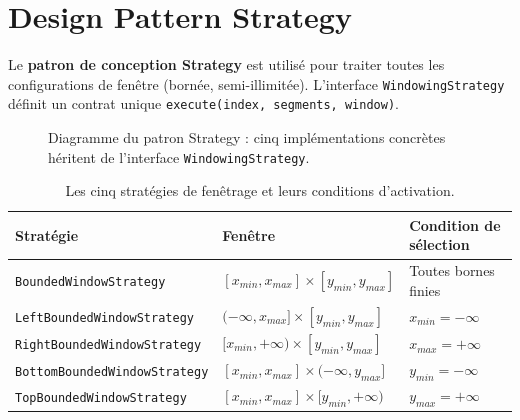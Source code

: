 \documentclass[11pt,a4paper]{article}
\begin{document}
\section{Design Pattern Strategy}

Le \textbf{patron de conception Strategy} est utilisé pour traiter toutes les configurations de fenêtre (bornée, semi-illimitée). L'interface \texttt{WindowingStrategy} définit un contrat unique \texttt{execute(index, segments, window)}.

\begin{figure}[h]
\centering
{}
\caption{Diagramme du patron Strategy : cinq implémentations concrètes héritent de l'interface \texttt{WindowingStrategy}.}
\label{fig:strategy}
\end{figure}

\begin{table}[h]
\centering
\begin{tabular}{@{}lll@{}}
\toprule
\textbf{Stratégie} & \textbf{Fenêtre} & \textbf{Condition de sélection} \\
\midrule
\texttt{BoundedWindowStrategy}       & $[x_{min}, x_{max}] \times [y_{min}, y_{max}]$ & Toutes bornes finies \\
\texttt{LeftBoundedWindowStrategy}   & $(-\infty, x_{max}] \times [y_{min}, y_{max}]$ & $x_{min} = -\infty$ \\
\texttt{RightBoundedWindowStrategy}  & $[x_{min}, +\infty) \times [y_{min}, y_{max}]$ & $x_{max} = +\infty$ \\
\texttt{BottomBoundedWindowStrategy} & $[x_{min}, x_{max}] \times (-\infty, y_{max}]$ & $y_{min} = -\infty$ \\
\texttt{TopBoundedWindowStrategy}    & $[x_{min}, x_{max}] \times [y_{min}, +\infty)$ & $y_{max} = +\infty$ \\
\bottomrule
\end{tabular}
\caption{Les cinq stratégies de fenêtrage et leurs conditions d'activation.}
\end{table}
\end{document}
